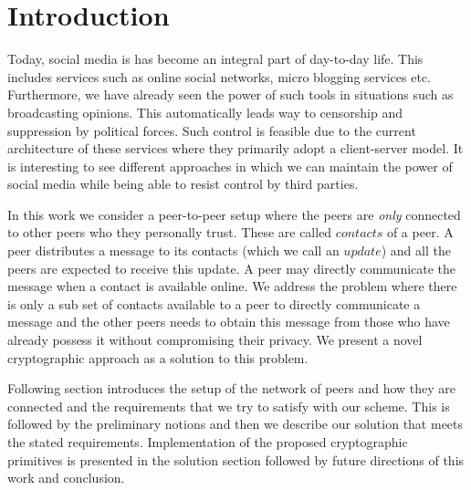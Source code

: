 \section{Introduction}

Today, social media is has become an integral part of day-to-day life. This includes services such as online social networks, micro blogging services etc. Furthermore, we have already seen the power of such tools in situations such as broadcasting opinions. This automatically leads way to censorship and suppression by political forces. Such control is feasible due to the current architecture of these services where they primarily adopt a client-server model. It is interesting to see different approaches in which we can maintain the power of social media while being able to resist control by third parties.

In this work we consider a peer-to-peer setup where the peers are \emph{only} connected to other peers who they personally trust. These are called $contacts$ of a peer. A peer distributes a message to its contacts (which we call an $update$) and all the peers are expected to receive this update. A peer may directly communicate the message when a contact is available online. We address the problem where there is only a sub set of contacts available to a peer to directly communicate a message and the other peers needs to obtain this message from those who have already possess it without compromising their privacy. We present a novel cryptographic approach as a solution to this problem.

Following section introduces the setup of the network of peers and how they are connected and the requirements that we try to satisfy with our scheme. This is followed by the preliminary notions and then we describe our solution that meets the stated requirements. Implementation of the proposed cryptographic primitives is presented in the solution section followed by future directions of this work and conclusion.
